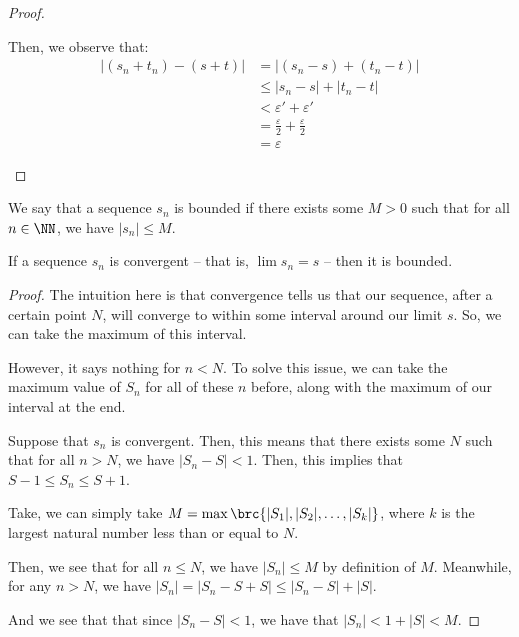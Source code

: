 \documentclass[openany]{book}
\begin{document}
\begin{proof}
\begin{innerproof}
		Then, we observe that:
		\begin{align*}
			\lvert (s_n + t_n) - (s + t) \rvert &= \lvert (s_n - s) + (t_n - t) \rvert \\
			&\leq \lvert s_n - s \rvert + \lvert t_n - t \rvert \\
			&< \varepsilon' + \varepsilon' \\
			&= \frac{\varepsilon}{2} + \frac{\varepsilon}{2} \\
			&= \varepsilon
		\end{align*}
	\end{innerproof}
\end{proof}

\begin{defn}
	We say that a sequence $s_n$ is bounded if there exists some $M > 0$ such that for all $n \in \NN$, we have $\lvert s_n \rvert \leq M$.
\end{defn}

\begin{thm}
	If a sequence $s_n$ is convergent -- that is, $\lim s_n = s$ -- then it is bounded.
\end{thm}
\begin{proof}
	The intuition here is that convergence tells us that our sequence, after a certain point $N$, will converge to within some interval around our limit $s$. So, we can take the maximum of this interval.
	
	However, it says nothing for $n < N$. To solve this issue, we can take the maximum value of $S_n$ for all of these $n$ before, along with the maximum of our interval at the end. 
	
	Suppose that $s_n$ is convergent. Then, this means that there exists some $N$ such that for all $n > N$, we have $\lvert S_n - S \rvert < 1$. Then, this implies that $S - 1 \leq S_n \leq S + 1$.
	
	Take, we can simply take $M = \max\brc{\lvert S_1 \rvert, \lvert S_2 \rvert, \ldots, \lvert S_k \rvert}$, where $k$ is the largest natural number less than or equal to $N$.
	
	Then, we see that for all $n \leq N$, we have $\lvert S_n \rvert \leq M$ by definition of $M$. Meanwhile, for any $n > N$, we have $\lvert S_n \rvert = \lvert S_n - S + S \rvert \leq \lvert S_n - S \rvert + \lvert S \rvert$.
	
	And we see that that since $\lvert S_n - S \rvert < 1$, we have that $\lvert S_n \rvert < 1 + \lvert S \rvert < M$.
\end{proof}
\end{document}
